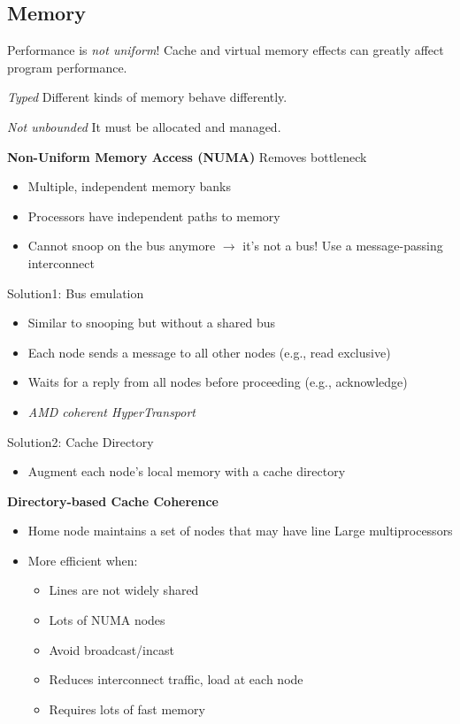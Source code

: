 \documentclass{article}
\begin{document}
\subsection{Memory}

Performance is \textit{not uniform}!
Cache and virtual memory effects can greatly affect program performance.

\textit{Typed}
Different kinds of memory behave differently.

\textit{Not unbounded}
It must be allocated and managed.

\textbf{Non-Uniform Memory Access (NUMA)} Removes bottleneck
\begin{itemize}
    \item Multiple, independent memory banks
    \item Processors have independent paths to memory
    \item Cannot snoop on the bus anymore $\rightarrow$ it's not a bus! Use a message-passing interconnect
\end{itemize}

Solution1: Bus emulation
\begin{itemize}
    \item Similar to snooping but without a shared bus
    \item Each node sends a message to all other nodes (e.g., read exclusive)
    \item Waits for a reply from all nodes before proceeding (e.g., acknowledge)
    \item \textit{AMD coherent HyperTransport}
\end{itemize}

Solution2: Cache Directory
\begin{itemize}
    \item Augment each node's local memory with a cache directory
\end{itemize}

\textbf{Directory-based Cache Coherence}
\begin{itemize}
    \item Home node maintains a set of nodes that may have line Large multiprocessors
    \item More efficient when:
    \begin{itemize}
        \item Lines are not widely shared
        \item Lots of NUMA nodes
        \item Avoid broadcast/incast
        \item Reduces interconnect traffic, load at each node
        \item Requires lots of fast memory
    \end{itemize}
\end{itemize}
\end{document}
